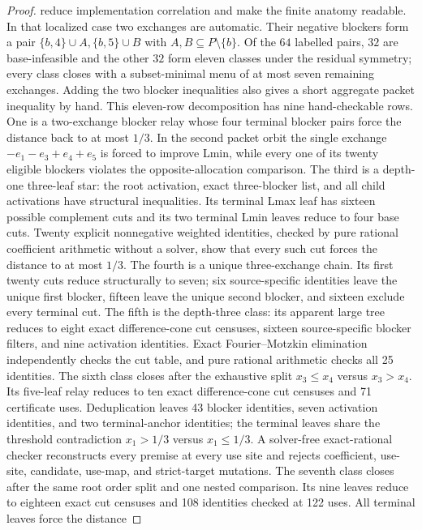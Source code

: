\documentclass[11pt]{article}
\begin{document}
\begin{proof}
reduce implementation correlation and make the finite anatomy readable.  In
that localized case two exchanges are automatic.  Their negative blockers
form a pair $\{b,4\}\cup A,\{b,5\}\cup B$ with
$A,B\subseteq P\setminus\{b\}$.  Of the $64$ labelled pairs, $32$ are
base-infeasible and the other $32$ form eleven classes under the residual
symmetry; every class closes with a subset-minimal menu of at most seven
remaining exchanges.  Adding the two blocker inequalities also gives a
short aggregate packet inequality by hand.  This eleven-row decomposition
has nine hand-checkable rows.  One is a two-exchange blocker relay whose four
terminal blocker pairs force the distance back to at most $1/3$.  In the second
packet orbit the single exchange
$-e_1-e_3+e_4+e_5$ is forced to improve Lmin, while every one of its twenty
eligible blockers violates the opposite-allocation comparison.  The third is
a depth-one three-leaf star: the root activation, exact three-blocker list,
and all child activations have structural inequalities.  Its terminal Lmax
leaf has sixteen possible complement cuts and its two terminal Lmin leaves
reduce to four base cuts.  Twenty explicit nonnegative weighted identities,
checked by pure rational coefficient arithmetic without a solver, show that
every such cut forces the distance to at most $1/3$.  The fourth is a unique
three-exchange chain.  Its first twenty cuts reduce structurally to seven;
six source-specific identities leave the unique first blocker, fifteen leave
the unique second blocker, and sixteen exclude every terminal cut.  The fifth
is the depth-three class: its apparent large tree reduces to eight exact
difference-cone cut censuses, sixteen source-specific blocker filters, and
nine activation identities.  Exact Fourier--Motzkin elimination independently
checks the cut table, and pure rational arithmetic checks all 25 identities.
The sixth class closes after the exhaustive split $x_3\le x_4$ versus
$x_3>x_4$.  Its five-leaf relay reduces to ten exact difference-cone cut
censuses and 71 certificate uses.  Deduplication leaves 43 blocker identities,
seven activation identities, and two terminal-anchor identities; the terminal
leaves share the threshold contradiction $x_1>1/3$ versus $x_1\le1/3$.
A solver-free exact-rational checker reconstructs every premise at every use
site and rejects coefficient, use-site, candidate, use-map, and strict-target
mutations.  The seventh class closes after the same root order split and one
nested comparison.  Its nine leaves reduce to eighteen exact cut censuses and
108 identities checked at 122 uses.  All terminal leaves force the distance

\end{proof}
\end{document}
